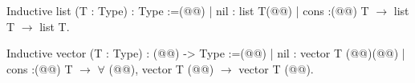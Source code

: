 Inductive list (T : Type) : Type :=(@\vspace{-0.04cm}@)
| nil : list T(@\vspace{-0.04cm}@)
| cons :(@\vspace{-0.04cm}@)
    T $\rightarrow$ list T $\rightarrow$ list T.

Inductive vector (T : Type) : (@@) -> Type :=(@\vspace{-0.04cm}@)
| nil : vector T (@@)(@\vspace{-0.04cm}@)
| cons :(@\vspace{-0.04cm}@)
    T $\rightarrow$ $\forall$ (@@), vector T (@@) $\rightarrow$ vector T (@@).
